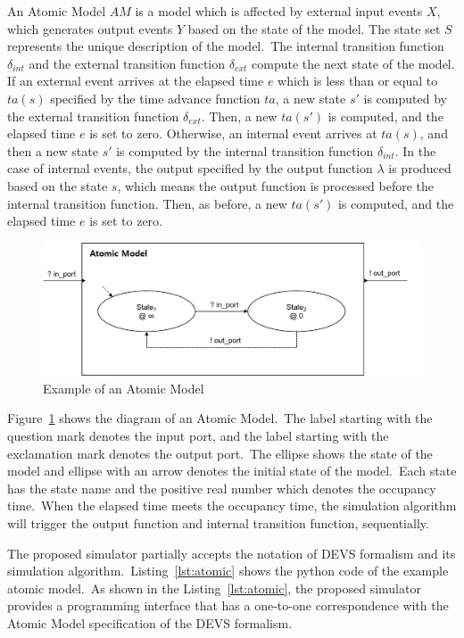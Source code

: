 \documentclass{scsSimAUDPaperFormat}
\begin{document}
An Atomic Model $AM$ is a model which is affected by external input events $X$, which generates output events $Y$ based on the state of the model. The state set $S$ represents the unique description of the model.~The internal transition function $\delta_{int}$ and the external transition function $\delta_{ext}$ compute the next state of the model.
If an external event arrives at the elapsed time $e$ which is less than or
equal to $ta(s)$ specified by the time advance function $ta$, a new
state $s'$ is computed by the external transition function  $\delta_{ext}$. Then, a new $ta(s')$ is computed, and the elapsed time $e$ is set to zero.
Otherwise, an internal event arrives at $ta(s)$, and then a new state
$s'$ is computed by the internal transition function $\delta_{int}$.
In the case of internal events, the output specified by the output function
$\lambda$ is produced based on the state $s$, which means the output function is processed before the internal transition function.
Then, as before, a new $ta(s')$ is computed, and the elapsed time $e$ is set to zero. 


\begin{figure}[!h]
    \centering
    \includegraphics[width=1.0\columnwidth]{fig/Atomic_model}
    \caption{Example of an Atomic Model}
    \label{Fig:AtomicModel}
\end{figure}

Figure~\ref{Fig:AtomicModel} shows the diagram of an Atomic Model.~The label starting with the question mark denotes the input port, and the label starting with the exclamation mark denotes the output port.~The ellipse shows the state of the model and ellipse with an arrow denotes the initial state of the model.~Each state has the state name and the positive real number which denotes the occupancy time.~When the elapsed time meets the occupancy time, the simulation algorithm will trigger the output function and internal transition function, sequentially. 

The proposed simulator partially accepts the notation of DEVS formalism and its simulation algorithm.~Listing~\ref{lst:atomic} shows the python code of the example atomic model.~As shown in the Listing~\ref{lst:atomic}, the proposed simulator provides a programming interface that has a one-to-one correspondence with the Atomic Model specification of the DEVS formalism.
\end{document}
